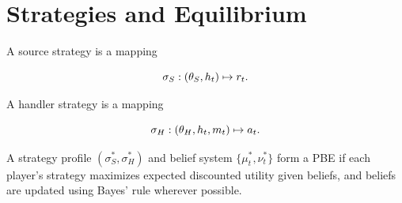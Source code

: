 \section{Strategies and Equilibrium}

A source strategy is a mapping


\[
\sigma_S : (\theta_S, h_t) \mapsto r_t.
\]



A handler strategy is a mapping


\[
\sigma_H : (\theta_H, h_t, m_t) \mapsto a_t.
\]



\begin{definition}
A strategy profile $(\sigma_S^*, \sigma_H^*)$ and belief system
$\{\mu_t^*, \nu_t^*\}$ form a PBE if each player's strategy maximizes
expected discounted utility given beliefs, and beliefs are updated using
Bayes' rule wherever possible.
\end{definition}
